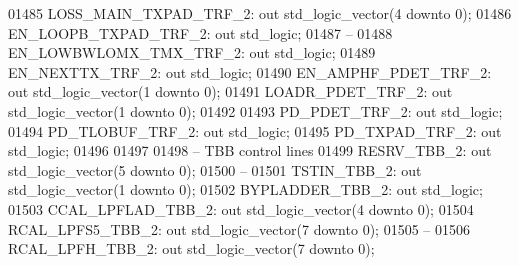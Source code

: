 \begin{DoxyCode}
01485         LOSS\_MAIN\_TXPAD\_TRF\_2:  \textcolor{keywordflow}{out} \textcolor{comment}{std\_logic\_vector}(\textcolor{vhdllogic}{}\textcolor{vhdllogic}{4} \textcolor{keywordflow}{downto} \textcolor{vhdllogic}{}\textcolor{vhdllogic}{0});
01486         EN\_LOOPB\_TXPAD\_TRF\_2:   \textcolor{keywordflow}{out} \textcolor{comment}{std\_logic};
01487 \textcolor{keyword}{        --}
01488         EN\_LOWBWLOMX\_TMX\_TRF\_2: \textcolor{keywordflow}{out} \textcolor{comment}{std\_logic};
01489         EN\_NEXTTX\_TRF\_2:    \textcolor{keywordflow}{out} \textcolor{comment}{std\_logic};
01490         EN\_AMPHF\_PDET\_TRF\_2:    \textcolor{keywordflow}{out} \textcolor{comment}{std\_logic\_vector}(\textcolor{vhdllogic}{}\textcolor{vhdllogic}{1} \textcolor{keywordflow}{downto} \textcolor{vhdllogic}{}\textcolor{vhdllogic}{0});
01491         LOADR\_PDET\_TRF\_2:   \textcolor{keywordflow}{out} \textcolor{comment}{std\_logic\_vector}(\textcolor{vhdllogic}{}\textcolor{vhdllogic}{1} \textcolor{keywordflow}{downto} \textcolor{vhdllogic}{}\textcolor{vhdllogic}{0});
01492 
01493         PD\_PDET\_TRF\_2:  \textcolor{keywordflow}{out} \textcolor{comment}{std\_logic};
01494         PD\_TLOBUF\_TRF\_2:    \textcolor{keywordflow}{out} \textcolor{comment}{std\_logic};
01495         PD\_TXPAD\_TRF\_2: \textcolor{keywordflow}{out} \textcolor{comment}{std\_logic};
01496 
01497 
01498 \textcolor{keyword}{        -- TBB control lines}
01499         RESRV\_TBB\_2:    \textcolor{keywordflow}{out} \textcolor{comment}{std\_logic\_vector}(\textcolor{vhdllogic}{}\textcolor{vhdllogic}{5} \textcolor{keywordflow}{downto} \textcolor{vhdllogic}{}\textcolor{vhdllogic}{0});
01500 \textcolor{keyword}{        --}
01501         TSTIN\_TBB\_2:    \textcolor{keywordflow}{out} \textcolor{comment}{std\_logic\_vector}(\textcolor{vhdllogic}{}\textcolor{vhdllogic}{1} \textcolor{keywordflow}{downto} \textcolor{vhdllogic}{}\textcolor{vhdllogic}{0});
01502         BYPLADDER\_TBB\_2:    \textcolor{keywordflow}{out} \textcolor{comment}{std\_logic};
01503         CCAL\_LPFLAD\_TBB\_2:  \textcolor{keywordflow}{out} \textcolor{comment}{std\_logic\_vector}(\textcolor{vhdllogic}{}\textcolor{vhdllogic}{4} \textcolor{keywordflow}{downto} \textcolor{vhdllogic}{}\textcolor{vhdllogic}{0});
01504         RCAL\_LPFS5\_TBB\_2:   \textcolor{keywordflow}{out} \textcolor{comment}{std\_logic\_vector}(\textcolor{vhdllogic}{}\textcolor{vhdllogic}{7} \textcolor{keywordflow}{downto} \textcolor{vhdllogic}{}\textcolor{vhdllogic}{0});
01505 \textcolor{keyword}{        --}
01506         RCAL\_LPFH\_TBB\_2:    \textcolor{keywordflow}{out} \textcolor{comment}{std\_logic\_vector}(\textcolor{vhdllogic}{}\textcolor{vhdllogic}{7} \textcolor{keywordflow}{downto} \textcolor{vhdllogic}{}\textcolor{vhdllogic}{0});

\end{DoxyCode}
